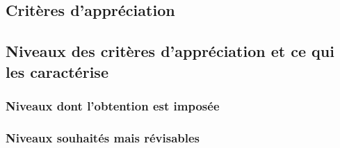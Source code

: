 \subsection{Critères d’appréciation}

\subsection{Niveaux des critères d’appréciation et ce qui les caractérise}
\subsubsection{Niveaux dont l’obtention est imposée}
\subsubsection{Niveaux souhaités mais révisables}

